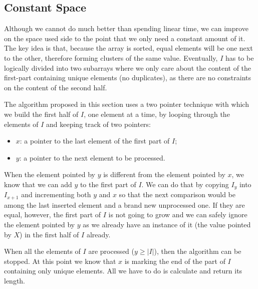 

\subsection{Constant Space}
\label{sec:remove_duplicated_sorted_array_inplace:constant_space}

Although we cannot do much better than spending linear time, we can improve on the space used side to the point that we only need a constant amount of it.
The key idea is that, because the array is sorted, equal elements will be one next
to the other, therefore forming clusters of the same value. 
Eventually, $I$ has to be logically divided into
two subarrays where we only care about the content of the first-part containing unique elements (no duplicates), as
there are no constraints on the content of the second half.

The algorithm proposed in this section uses a two pointer technique with which we
build the first half of $I$, one element at a time, by looping through the
elements of $I$ and keeping track of two pointers:

\begin{itemize}
	\item $x$: a pointer to the last element of the first part of $I$;
	\item $y$: a pointer to the next element to be processed.
\end{itemize}

When the element pointed by $y$ is different from the element pointed by $x$, we know that we can add
$y$ to the first part of $I$. We can do that by copying $I_y$ into $I_{x+1}$ and incrementing both
$y$ and $x$ so that the next comparison would be among the last inserted element and a brand new unprocessed one.
If they are equal, however, the first part of $I$ is not going to grow and we can
safely ignore the element pointed by $y$ as we already have an instance of it (the value pointed by $X$) in the first half of $I$ already.

When all the elements of $I$ are processed ($y \geq |I|$), then the algorithm can be stopped. 
At this point
we know that $x$ is marking the end of the part of $I$ containing only unique elements. 
All we have to do is calculate and return its length. 

